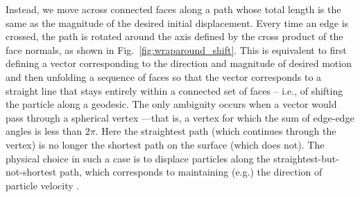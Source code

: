 \documentclass[preprint,12pt]{elsarticle}
\begin{document}
Instead, we move across connected faces along a path whose total length is the same as the magnitude of the desired initial displacement. Every time an edge is crossed, the path is rotated around the axis defined by the cross product of the face normals, as shown in Fig.~\ref{fig:wraparound_shift}. This is equivalent to first defining a vector corresponding to the direction and magnitude of desired motion and then unfolding a sequence of faces so that the vector corresponds to a straight line that stays entirely within a connected set of faces -- i.e., of shifting the particle along  a geodesic.
The only ambiguity occurs when a vector would pass through a spherical vertex ---that is, a vertex for which the sum of edge-edge angles is less than $2\pi$.
Here the straightest path (which continues through the vertex) is no longer the shortest path on the surface (which does not). The physical choice in such a case is to displace particles along the straightest-but-not-shortest path, which corresponds to maintaining (e.g.) the direction of particle velocity \cite{polthier2006straightest}.
\end{document}
